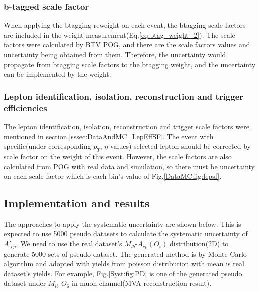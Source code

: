 		\subsubsection{b-tagged scale factor}
		\label{sssec:Syst_btag}

			When applying the btagging reweight on each event, the btagging scale factors are included in the weight measurement(Eq.\ref{eq:btag_weight_2}). The scale factors were calculated by BTV POG, and there are the scale factors values and uncertainty being obtained from them. Therefore, the uncertainty would propagate from btagging scale factors to the btagging weight, and the uncertainty can be implemented by the weight.

		\subsubsection{Lepton identification, isolation, reconstruction and trigger efficiencies}
		\label{sssec:Syst_lepsf}

			The lepton identification, isolation, reconstruction and trigger scale factors were mentioned in section.\ref{sssec:DataAndMC_LepEffSF}. The event with specific(under corresponding $p_T$, $\eta$ values) selected lepton should be corrected by scale factor on the weight of this event. However, the scale factors are also calculated from POG with real data and simulation, so there must be uncertainty on each scale factor which is each bin's value of Fig.\ref{DataMC:fig:lepsf}.

	\subsection{Implementation and results}
	\label{ssec:Syst_imp_result}

		The approaches to apply the systematic uncertainty are shown below. This is expected to use 5000 pseudo datasets to calculate the systematic uncertainty of $A'_{cp}$. We need to use the real dataset's $M_{lb}$-$A_{cp}(O_i)$ distribution(2D) to generate 5000 sets of pseudo dataset. The generated method is by Monte Carlo algorithm and adopted with yields from poisson distribution with mean is real dataset's yields. For example, Fig.\ref{Syst:fig:PD} is one of the generated pseudo dataset under $M_{lb}$-$O_{6}$ in muon channel(MVA reconstruction result). 

